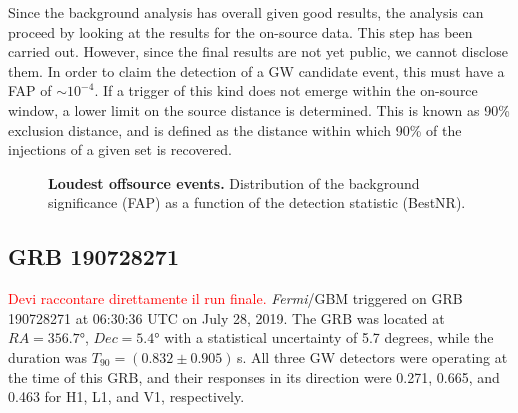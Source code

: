 \documentclass[binding=0.6cm, LaM]{sapthesis}
\newcommand{\fpg}[1]{\textcolor{red}{#1} }
\begin{document}
	Since the background analysis has overall given good results,
	the analysis can proceed by looking at the results for the on-source data.
	This step has been carried out. However, since the final results are not yet public, we cannot disclose them.
	In order to claim the detection of a GW candidate event, this 
	must have a FAP of $\sim 10^{-4}$.  If a trigger of this kind does not emerge within the on-source window,
	a lower limit on the source distance is determined.
        This is known as 90\% exclusion distance, and is
	defined as the distance within which 90\% of the injections of a given set is recovered.

        \begin{figure}[!t]
          \noindent
          \label{loudestoffsourcevent1}
          \centering
          \caption{\textbf{Loudest offsource events.} Distribution of the background significance (FAP) as a function of the detection statistic (BestNR).}
          \label{fig:loudestoffsourcevent1}
        \end{figure}

\subsection{GRB 190728271}
\fpg{Devi raccontare direttamente il run finale.}
        {\it Fermi}/GBM triggered on GRB 190728271 at 06:30:36 UTC on July 28, 2019.
        The GRB was located at $RA = \ang{356.7}$, $Dec = \ang{5.4}$
        with a statistical uncertainty of 5.7 degrees, while the duration was $T_{90} = (0.832 \pm 0.905)\,$s.
        All three GW detectors were operating at the time of this GRB,
        and their responses in its direction were 0.271, 0.665, and 0.463 for H1, L1, and V1, respectively.
\end{document}
